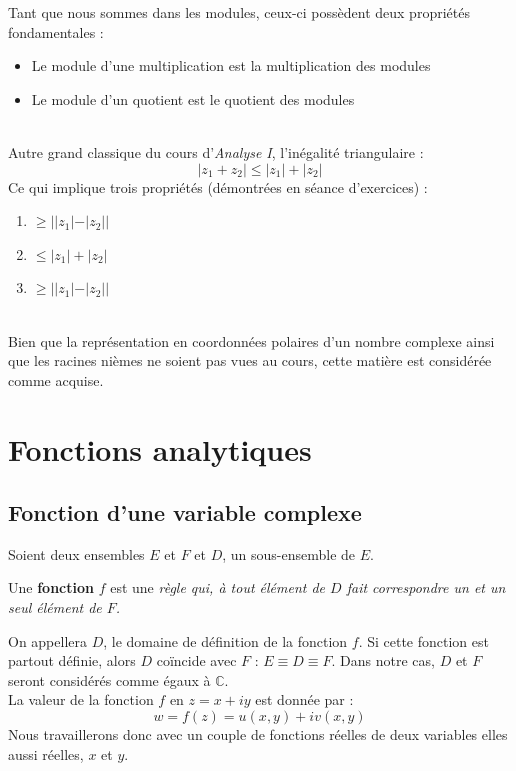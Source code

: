         Tant que nous sommes dans les modules, ceux-ci possèdent deux propriétés 
        fondamentales :
        \begin{itemize}
        \item Le module d'une multiplication est la multiplication des modules
        \item Le module d'un quotient est le quotient des modules
        \end{itemize}\ \\
        
        Autre grand classique du cours d'\textit{Analyse I}, l'inégalité triangulaire :
        \begin{equation}
            |z_1 + z_2| \leq |z_1|+|z_2|
        \end{equation}
        Ce qui implique trois propriétés (démontrées en séance d'exercices) :
        \begin{enumerate}
        \item {} $\geq ||z_1| - |z_2||$
        \item {} $\leq |z_1| + |z_2|$
        \item {} $\geq ||z_1| - |z_2||$
        \end{enumerate}\ \\
        
        Bien que la représentation en coordonnées polaires d'un nombre complexe ainsi que
        les racines nièmes ne soient pas vues au cours, cette matière est considérée comme
        acquise.

        
\section{Fonctions analytiques}
    \subsection{Fonction d'une variable complexe}
    Soient deux ensembles $E$ et $F$ et $D$, un sous-ensemble de $E$. 
    \begin{center}
    Une \textbf{fonction}
    $f$ est une \textit{règle qui, à tout élément de $D$ fait correspondre un et un seul
    élément de $F$.}
    \end{center}
    On appellera $D$, le domaine de définition de la fonction $f$. Si cette fonction est 
    partout définie, alors $D$ coïncide avec $F$ : $E \equiv D \equiv F$. Dans notre cas, $D$ et $F$
    seront considérés comme égaux à $\mathbb{C}$.\\
    La valeur de la fonction $f$ en $z = x+iy$ est donnée par :
    \begin{equation}
        w = f(z) = u(x,y) + iv(x,y)
    \end{equation}
    Nous travaillerons donc avec un couple de  fonctions réelles de deux variables elles 
    aussi réelles, $x$ et $y$.
    
